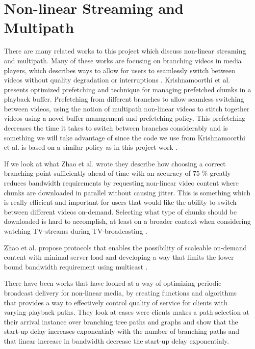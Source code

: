 \section{Non-linear Streaming and Multipath}
\label{sec:nonlinear}
There are many related works to this project which discuss non-linear streaming and multipath. Many of these works are focusing on branching videos in media players, which describes ways to allow for users to seamlessly switch between videos without quality degradation or interruptions \cite{qualbranch, hasmultipath,scalableOnDemand}. Krishnamoorthi et al. \cite{hasmultipath} presents optimized prefetching and technique for managing prefetched chunks in a playback buffer. Prefetching from different branches to allow seamless switching between videos, using the notion of multipath non-linear videos to stitch together videos using a novel buffer management and prefetching policy. This prefetching decreases the time it takes to switch between branches considerably and is something we will take advantage of since the code we use from Krishnamoorthi et al.\cite{qualbranch} is based on a similar policy as in this project work \cite{hasmultipath}. 

If we look at what Zhao et al. \cite{scalableOnDemand} wrote they describe how choosing a correct branching point sufficiently ahead of time with an accuracy of 75 \% greatly reduces bandwidth requirements by requesting non-linear video content where chunks are downloaded in parallel without causing jitter. This is something which is really efficient and important for users that would like the ability to switch between different videos on-demand. Selecting what type of chunks should be downloaded is hard to accomplish, at least on a broader context when considering watching TV-streams during TV-broadcasting \cite{scalableOnDemand}. 

Zhao et al. \cite{scalableOnDemand} propose protocols that enables the possibility of scaleable on-demand content with minimal server load and developing a way that limits the lower bound bandwidth requirement using multicast \cite{scalableOnDemand}. 

There have been works that have looked at a way of optimizing periodic broadcast delivery for non-linear media, by creating functions and algorithms that provides a way to effectively control quality of service for clients with varying playback paths. They look at cases were clients makes a path selection at their arrival instance over branching tree paths and graphs and show that the start-up delay increases exponentialy with the number of branching paths and that linear increase in bandwidth decrease the start-up delay exponentialy\cite{optimizedbroadcast}.


